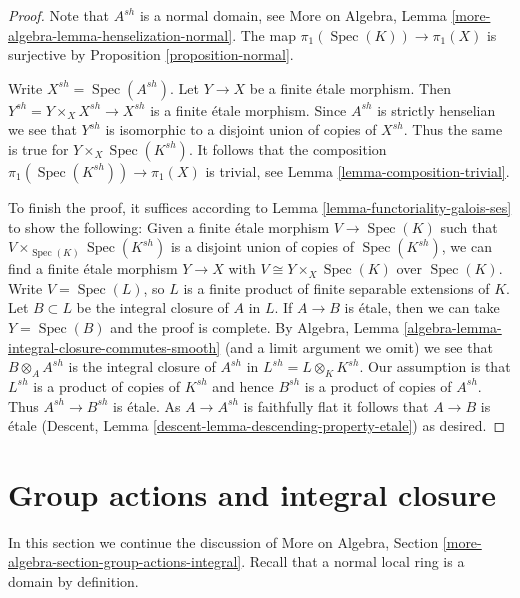 \documentclass{stacks-project}
\theoremstyle{plain}
\theoremstyle{definition}
\theoremstyle{remark}
\numberwithin{equation}{subsection}
\def\Spec{\mathop{\mathrm{Spec}}}
\begin{document}
\begin{proof}
Note that $A^{sh}$ is a normal domain, see
More on Algebra, Lemma \ref{more-algebra-lemma-henselization-normal}.
The map $\pi_1(\Spec(K)) \to \pi_1(X)$ is surjective by
Proposition \ref{proposition-normal}.

\medskip\noindent
Write $X^{sh} = \Spec(A^{sh})$. Let $Y \to X$ be a finite \'etale morphism.
Then $Y^{sh} = Y \times_X X^{sh} \to X^{sh}$ is a finite \'etale morphism.
Since $A^{sh}$ is strictly henselian we see that $Y^{sh}$ is isomorphic
to a disjoint union of copies of $X^{sh}$. Thus the same is true for
$Y \times_X \Spec(K^{sh})$. It follows that the composition
$\pi_1(\Spec(K^{sh})) \to \pi_1(X)$ is trivial, see
Lemma \ref{lemma-composition-trivial}.

\medskip\noindent
To finish the proof, it suffices according to
Lemma \ref{lemma-functoriality-galois-ses}
to show the following: Given a finite \'etale morphism
$V \to \Spec(K)$ such that $V \times_{\Spec(K)} \Spec(K^{sh})$
is a disjoint union of copies of $\Spec(K^{sh})$, we can find a
finite \'etale morphism
$Y \to X$ with $V \cong Y \times_X \Spec(K)$ over $\Spec(K)$.
Write $V = \Spec(L)$, so $L$ is a finite product of
finite separable extensions of $K$.
Let $B \subset L$ be the integral closure of $A$ in $L$.
If $A \to B$ is \'etale, then we can take $Y = \Spec(B)$
and the proof is complete. By
Algebra, Lemma \ref{algebra-lemma-integral-closure-commutes-smooth}
(and a limit argument we omit)
we see that $B \otimes_A A^{sh}$ is the integral closure of
$A^{sh}$ in $L^{sh} = L \otimes_K K^{sh}$.
Our assumption is that $L^{sh}$ is a product of copies of
$K^{sh}$ and hence $B^{sh}$ is a product of copies of $A^{sh}$.
Thus $A^{sh} \to B^{sh}$ is \'etale. As $A \to A^{sh}$ is
faithfully flat it follows that $A \to B$ is \'etale
(Descent, Lemma \ref{descent-lemma-descending-property-etale})
as desired.
\end{proof}







\section{Group actions and integral closure}
\label{section-group-actions-integral}

\noindent
In this section we continue the discussion of
More on Algebra, Section \ref{more-algebra-section-group-actions-integral}.
Recall that a normal local ring is a domain by definition.
\end{document}
